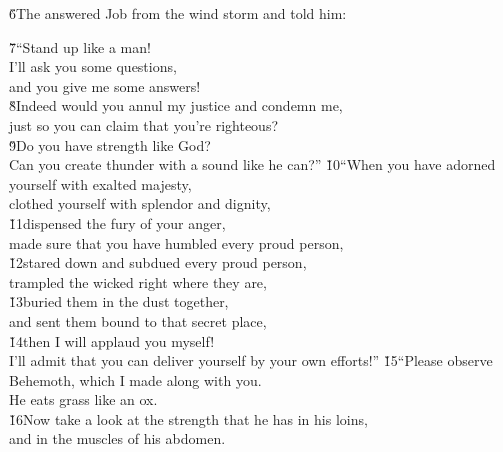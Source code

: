 \v{6}The  answered Job from the wind storm and told him:

\begin{poetry}
\poeml \v{7}``Stand up like a man! \\
\poemll    I'll ask you some questions, \\
\poemlll       and you give me some answers! \\
\poeml \v{8}Indeed would you annul my justice and condemn me, \\
\poemll    just so you can claim that you're righteous? \\
\poeml \v{9}Do you have strength like God? \\
\poemll    Can you create thunder with a sound like he can?''
\poeml \v{10}``When you have adorned yourself with exalted majesty, \\
\poemll    clothed yourself with splendor and dignity, \\
\poeml \v{11}dispensed the fury of your anger, \\
\poemll    made sure that you have humbled every proud person, \\
\poeml \v{12}stared down and subdued every proud person, \\
\poemll    trampled the wicked right where they are, \\
\poeml \v{13}buried them in the dust together, \\
\poemll    and sent them bound to that secret place, \\
\poeml \v{14}then I will applaud you myself! \\
\poemll    I'll admit that you can deliver yourself by your own efforts!''
\poeml \v{15}``Please observe Behemoth, which I made along with you. \\
\poemll    He eats grass like an ox. \\
\poeml \v{16}Now take a look at the strength that he has in his loins, \\
\poemll    and in the muscles of his abdomen. \\

\end{poetry}
